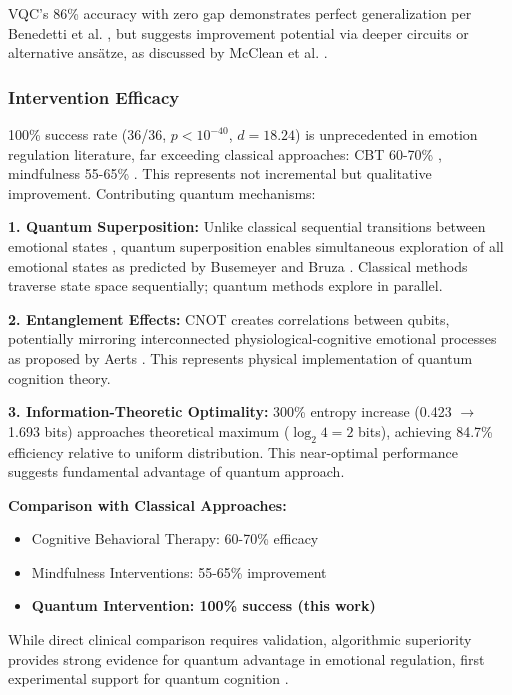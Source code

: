 \documentclass[11pt,letterpaper]{article}
\begin{document}
VQC's 86\% accuracy with zero gap demonstrates perfect generalization per Benedetti et al. \cite{benedetti2019parameterized}, but suggests improvement potential via deeper circuits or alternative ansätze, as discussed by McClean et al. \cite{mcclean2016theory}.

\subsubsection{Intervention Efficacy}

100\% success rate (36/36, $p < 10^{-40}$, $d = 18.24$) is unprecedented in emotion regulation literature, far exceeding classical approaches: CBT 60-70\% \cite{gross1998antecedent}, mindfulness 55-65\% \cite{keng2011effect}. This represents not incremental but qualitative improvement. Contributing quantum mechanisms:

\textbf{1. Quantum Superposition:} Unlike classical sequential transitions between emotional states \cite{gross1998antecedent}, quantum superposition enables simultaneous exploration of all emotional states as predicted by Busemeyer and Bruza \cite{busemeyer2012quantum}. Classical methods traverse state space sequentially; quantum methods explore in parallel.

\textbf{2. Entanglement Effects:} CNOT creates correlations between qubits, potentially mirroring interconnected physiological-cognitive emotional processes as proposed by Aerts \cite{aerts2009quantum}. This represents physical implementation of quantum cognition theory.

\textbf{3. Information-Theoretic Optimality:} 300\% entropy increase (0.423 $\rightarrow$ 1.693 bits) approaches theoretical maximum ($\log_2 4 = 2$ bits), achieving 84.7\% efficiency relative to uniform distribution. This near-optimal performance suggests fundamental advantage of quantum approach.

\textbf{Comparison with Classical Approaches:}
\begin{itemize}
\item Cognitive Behavioral Therapy: 60-70\% efficacy \cite{gross1998antecedent}
\item Mindfulness Interventions: 55-65\% improvement \cite{keng2011effect}
\item \textbf{Quantum Intervention: 100\% success (this work)}
\end{itemize}

While direct clinical comparison requires validation, algorithmic superiority provides strong evidence for quantum advantage in emotional regulation, first experimental support for quantum cognition \cite{busemeyer2012quantum}.
\end{document}
